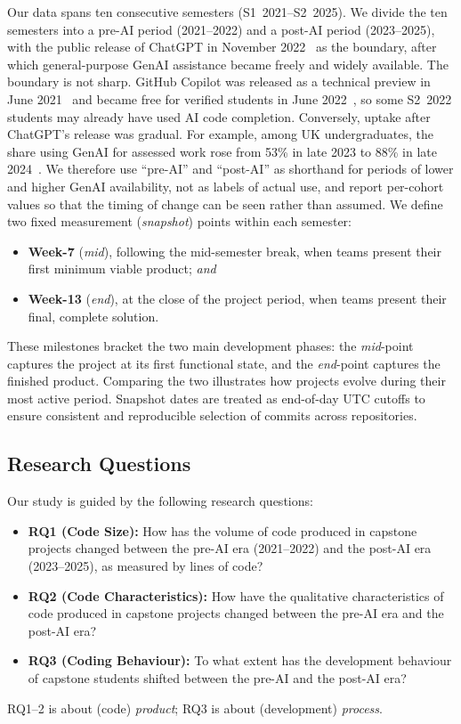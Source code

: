 \documentclass[sigconf,authorversion]{acmart}
\begin{document}
Our data spans ten consecutive semesters (S1~2021--S2~2025). 
We divide the ten semesters into a pre-AI period (2021--2022) and a post-AI period (2023--2025), with the public release of ChatGPT in November 2022~\cite{openai2022chatgpt} as the boundary, after which general-purpose GenAI assistance became freely and widely available. The boundary is not sharp. GitHub Copilot was released as a technical preview in June 2021~\cite{github2021copilotPreview} and became free for verified students in June 2022~\cite{github2022copilotGA}, so some S2~2022 students may already have used AI code completion. 
Conversely, uptake after ChatGPT's release was gradual. For example, among UK undergraduates, the share using GenAI for assessed work rose from 53\% in late 2023 to 88\% in late 2024~\cite{freeman2025hepi}.
We therefore use ``pre-AI'' and ``post-AI'' as shorthand for periods of lower and higher GenAI availability, not as labels of actual use, and report per-cohort values so that the timing of change can be seen rather than assumed.
We define two fixed measurement (\emph{snapshot}) points within each semester:
%
\begin{itemize} %
    \item \textbf{Week-7} (\emph{mid}), following the mid-semester break, when teams present their first minimum viable product; \emph{and} 
    \item \textbf{Week-13} (\emph{end}), at the close of the project period, when teams present their final, complete solution. 
\end{itemize}
%
These milestones bracket the two main development phases: the \emph{mid}-point captures the project at its first functional state, and the \emph{end}-point captures the finished product. Comparing the two illustrates how projects evolve during their most active period. Snapshot dates are treated as end-of-day UTC cutoffs to ensure consistent and reproducible selection of commits across repositories.

\subsection{Research Questions}
Our study is guided by the following research questions:
\begin{itemize}[topsep=0pt,leftmargin=*]
    \item \textbf{RQ1 (Code Size):} How has the volume of code produced in capstone projects changed between the pre-AI era (2021–2022) and the post-AI era (2023–2025), as measured by lines of code?

    \item \textbf{RQ2 (Code Characteristics):} How have the qualitative characteristics of code produced in capstone projects changed between the pre-AI era and the post-AI era?

    \item \textbf{RQ3 (Coding Behaviour):} To what extent has the development behaviour of capstone students shifted between the pre-AI and the post-AI era?

\end{itemize}
%
RQ1--2 is about (code) \emph{product}; RQ3 is about (development) \emph{process}.
\end{document}
